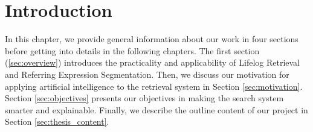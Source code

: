 \chapter{Introduction}
\label{chap-introduction}



\begin{ChapAbstract}
In this chapter, we provide general information about our work in four sections before getting into details in the following chapters.
The first section (\ref{sec:overview}) introduces the practicality and applicability of Lifelog Retrieval and Referring Expression Segmentation.
Then, we discuss our motivation for applying artificial intelligence to the retrieval system in Section \ref{sec:motivation}.
Section \ref{sec:objectives} presents our objectives in making the search system smarter and explainable. Finally, we describe the outline content of our project in Section \ref{sec:thesis_content}.


\end{ChapAbstract}






